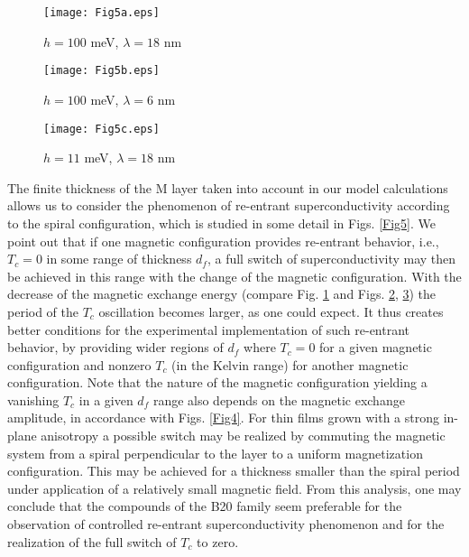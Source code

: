 \documentclass[prb,amsmath,amssymb,reprint]{revtex4-2}
\begin{document}
\begin{figure*}[htb]
\begin{subfigure}{.33\textwidth}
  \texttt{[image: Fig5a.eps]}
  \caption{$h=100$ meV, $\lambda=18$ nm}
  \label{Fig5a}
\end{subfigure}%
\begin{subfigure}{.33\textwidth}
  \texttt{[image: Fig5b.eps]}
  \caption{$h=100$ meV, $\lambda=6$ nm }
  \label{Fig5b}
\end{subfigure}%
\begin{subfigure}{.33\textwidth}
  \texttt{[image: Fig5c.eps]}
  \caption{$h=11$ meV, $\lambda=18$ nm}
  \label{Fig5c}
\end{subfigure}%
\caption{
Superconducting critical temperature $T_c$ as a
function of the M layer thickness $d_f$ within three different magnetic configurations, (a) for large exchange energy $h=100$ meV,
large spiral spatial period $\lambda=18$ nm and $d_s=21.4$ nm, (b) large exchange energy $h=100$ meV, short
spiral spatial period $\lambda=6$ nm and $d_s=$ 21 nm, and (c) for small exchange energy $h=11$ meV, large spiral spatial period $\lambda=18$ nm and $d_s=18.5$ nm (MnSi case).
}
\label{Fig5}
\end{figure*}

The finite thickness of the M layer taken into account in our model calculations allows us to consider the phenomenon of re-entrant superconductivity according to the spiral configuration, which is studied in some detail in Figs. \ref{Fig5}. We point out that if one magnetic configuration provides re-entrant behavior, i.e., $T_c=0$ in
some range of thickness $d_f$, a full switch of superconductivity may then be achieved in this range with the change of the magnetic configuration.
With the decrease of
the magnetic exchange energy (compare Fig. \ref{Fig5a} and Figs. \ref{Fig5b}, \ref{Fig5c}) the period of the  $T_c$
oscillation becomes larger, as one could expect. It thus creates better conditions
for the experimental implementation of such re-entrant behavior, by providing wider regions
of $d_f$ where $T_c=0$ for a given magnetic configuration and nonzero $T_c$ (in the Kelvin range) for another magnetic configuration. Note that the nature of the magnetic configuration yielding a vanishing  $T_c$ in a given $d_f$ range also depends on the magnetic exchange amplitude, in accordance with Figs. \ref{Fig4}.
 For thin films grown with a strong in-plane anisotropy a possible switch may be realized by commuting the magnetic system from a spiral
perpendicular to the layer to a uniform magnetization configuration. This  may be achieved for a thickness smaller than the spiral period under  application of a relatively small magnetic field. From this analysis, one may
conclude that the compounds of the B20 family seem preferable for the observation of
controlled re-entrant superconductivity phenomenon and for the realization of the full switch of $T_c$ to zero.
\end{document}
